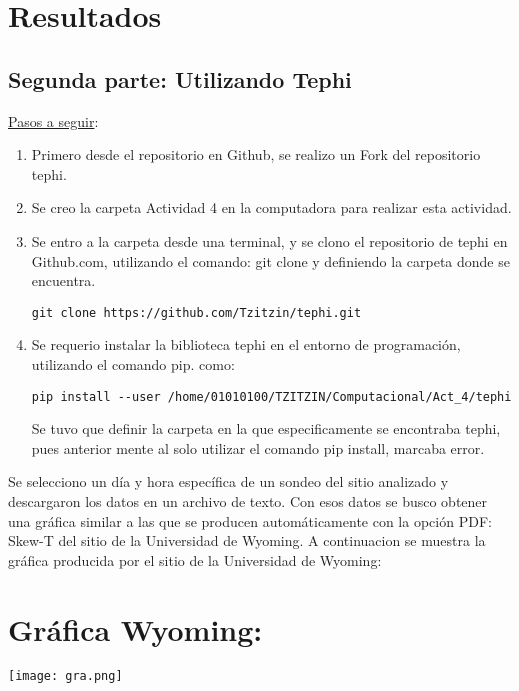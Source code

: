 \documentclass[12pt]{article}
\begin{document}
\section*{Resultados}
\subsection{Segunda parte: Utilizando Tephi}
\underline{Pasos a seguir}:

\begin{enumerate}
\item Primero desde el repositorio en Github, se realizo un Fork del repositorio tephi. 
\item Se creo la carpeta Actividad 4 en la computadora para realizar esta actividad. 
\item Se entro a la carpeta desde una terminal, y se clono el repositorio de tephi en Github.com, utilizando el comando: git clone y definiendo la carpeta donde se encuentra. 
\begin{verbatim}
git clone https://github.com/Tzitzin/tephi.git
\end{verbatim}
\item Se requerio instalar la biblioteca tephi en el entorno de programación, utilizando el comando pip. como:
\begin{verbatim}
pip install --user /home/01010100/TZITZIN/Computacional/Act_4/tephi
\end{verbatim}
Se tuvo que definir la carpeta en la que especificamente se encontraba tephi, pues anterior mente al solo utilizar el comando pip install, marcaba error. 
\end{enumerate}
Se selecciono un día y hora específica de un sondeo del sitio analizado y descargaron los datos en un archivo de texto. Con esos datos se busco obtener una gráfica similar a las que se producen automáticamente con la opción PDF: Skew-T del sitio de la Universidad de Wyoming.  
A continuacion se muestra la gráfica producida por el sitio de la Universidad de Wyoming:
\section*{Gráfica Wyoming:} 
\begin{center}
\texttt{[image: gra.png]}
\end{center}
\end{document}
